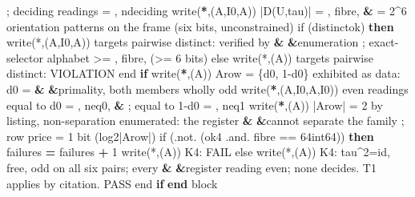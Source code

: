 \documentclass[10pt]{article}
\renewcommand{\_}{\origunderscore\allowbreak}
\newenvironment{Shaded}{}{}
\newcommand{\BuiltInTok}[1]{#1}
\newcommand{\DecValTok}[1]{#1}
\newcommand{\FunctionTok}[1]{#1}
\newcommand{\KeywordTok}[1]{\textbf{#1}}
\newcommand{\NormalTok}[1]{#1}
\newcommand{\OperatorTok}[1]{#1}
\newcommand{\StringTok}[1]{#1}
\begin{document}
\begin{Shaded}
\begin{Highlighting}[]
          \StringTok{\textquotesingle{} ; deciding readings = \textquotesingle{}}\NormalTok{, n\_deciding}
\BuiltInTok{     w}\NormalTok{rite(}\KeywordTok{*}\NormalTok{,}\StringTok{\textquotesingle{}(A,I0,A)\textquotesingle{}}\NormalTok{) }\StringTok{\textquotesingle{}  |D(U,tau)| = \textquotesingle{}}\NormalTok{, fibre, }\KeywordTok{\&}
          \StringTok{\textquotesingle{} = 2\^{}6 orientation patterns on the frame (six bits, unconstrained)\textquotesingle{}}
\BuiltInTok{     i}\NormalTok{f (distinct\_ok) }\KeywordTok{then}
        \FunctionTok{write(*}\NormalTok{,}\StringTok{\textquotesingle{}(A,I0,A)\textquotesingle{}}\FunctionTok{)} \StringTok{\textquotesingle{}  targets pairwise distinct: verified by }\KeywordTok{\&}
\StringTok{             }\KeywordTok{\&}\StringTok{enumeration ; exact{-}selector alphabet \textgreater{}= \textquotesingle{}}\NormalTok{, fibre, }\StringTok{\textquotesingle{} (\textgreater{}= 6 bits)\textquotesingle{}}
\BuiltInTok{     e}\NormalTok{lse}
        \FunctionTok{write(*}\NormalTok{,}\StringTok{\textquotesingle{}(A)\textquotesingle{}}\FunctionTok{)} \StringTok{\textquotesingle{}  targets pairwise distinct: VIOLATION\textquotesingle{}}
\BuiltInTok{     e}\NormalTok{nd }\KeywordTok{if}
\BuiltInTok{     w}\NormalTok{rite(}\KeywordTok{*}\NormalTok{,}\StringTok{\textquotesingle{}(A)\textquotesingle{}}\NormalTok{) }\StringTok{\textquotesingle{}  A\_row = \{d0, 1{-}d0\} exhibited as data: d0 = }\KeywordTok{\&}
\StringTok{          }\KeywordTok{\&}\StringTok{primality, both members wholly odd\textquotesingle{}}
\BuiltInTok{     w}\NormalTok{rite(}\KeywordTok{*}\NormalTok{,}\StringTok{\textquotesingle{}(A,I0,A,I0)\textquotesingle{}}\NormalTok{) }\StringTok{\textquotesingle{}  even readings equal to d0 = \textquotesingle{}}\NormalTok{, n\_eq0, }\KeywordTok{\&}
          \StringTok{\textquotesingle{} ; equal to 1{-}d0 = \textquotesingle{}}\NormalTok{, n\_eq1}
\BuiltInTok{     w}\NormalTok{rite(}\KeywordTok{*}\NormalTok{,}\StringTok{\textquotesingle{}(A)\textquotesingle{}}\NormalTok{) }\StringTok{\textquotesingle{}  |A\_row| = 2 by listing, non{-}separation enumerated: the register }\KeywordTok{\&}
\StringTok{          }\KeywordTok{\&}\StringTok{cannot separate the family ; row price = 1 bit (log2|A\_row|)\textquotesingle{}}
\BuiltInTok{     i}\NormalTok{f (}\OperatorTok{.not.}\NormalTok{ (ok4 }\OperatorTok{.and.}\NormalTok{ fibre }\OperatorTok{==} \DecValTok{64\_int64}\NormalTok{)) }\KeywordTok{then}
\NormalTok{        failures }\KeywordTok{=}\NormalTok{ failures }\KeywordTok{+} \DecValTok{1}
        \FunctionTok{write(*}\NormalTok{,}\StringTok{\textquotesingle{}(A)\textquotesingle{}}\FunctionTok{)} \StringTok{\textquotesingle{}  K4: FAIL\textquotesingle{}}
\BuiltInTok{     e}\NormalTok{lse}
        \FunctionTok{write(*}\NormalTok{,}\StringTok{\textquotesingle{}(A)\textquotesingle{}}\FunctionTok{)} \StringTok{\textquotesingle{}  K4: tau\^{}2=id, free, odd on all six pairs; every }\KeywordTok{\&}
\StringTok{             }\KeywordTok{\&}\StringTok{register reading even; none decides. T1 applies by citation. PASS\textquotesingle{}}
\BuiltInTok{     e}\NormalTok{nd }\KeywordTok{if}
  \KeywordTok{end}\NormalTok{ block}


\end{Highlighting}
\end{Shaded}
\end{document}
